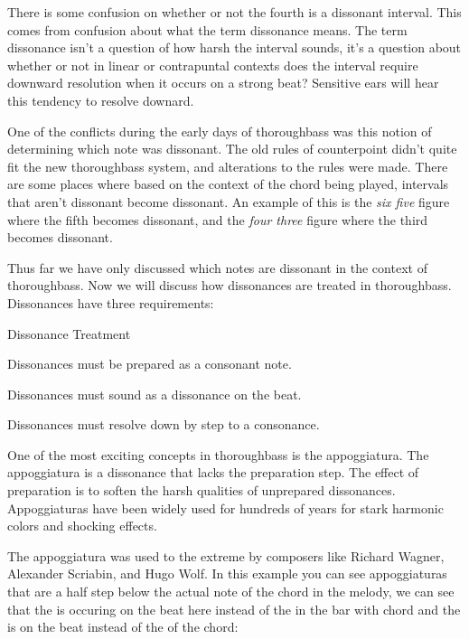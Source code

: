 There is some confusion on whether or not the fourth is a dissonant interval. This comes from confusion about what the term dissonance means. The term dissonance isn't a question of how harsh the interval sounds, it's a question about whether or not in linear or contrapuntal contexts does the interval require downward resolution when it occurs on a strong beat? Sensitive ears will hear this tendency to resolve downard.

One of the conflicts during the early days of thoroughbass was this notion of determining which note was dissonant. The old rules of counterpoint didn't quite fit the new thoroughbass system, and alterations to the rules were made. There are some places where based on the context of the chord being played, intervals that aren't dissonant become dissonant. An  example of this is the \emph{six five} figure where the fifth becomes dissonant, and the \emph{four three} figure where the third becomes dissonant.

Thus far we have only discussed which notes are dissonant in the context of thoroughbass. Now we will discuss how dissonances are treated in thoroughbass. Dissonances have three requirements:


\begin{bookStyledList} {Dissonance Treatment}
\item Dissonances must be prepared as a consonant note.
\item Dissonances must sound as a dissonance on the beat.
\item Dissonances must resolve down by step to a consonance.
\end{bookStyledList}

One of the most exciting concepts in thoroughbass is the appoggiatura. The appoggiatura is a dissonance that lacks the preparation step. The effect of preparation is to soften the harsh qualities of unprepared dissonances. Appoggiaturas have been widely used for hundreds of years for stark harmonic colors and shocking effects.

The appoggiatura was used to the extreme by composers like Richard Wagner, Alexander Scriabin, and Hugo Wolf. In this example you can see appoggiaturas that are a half step below the actual note of the chord in the melody, we can see that the  is occuring on the beat here instead of the  in the bar with  chord and the  is on the beat instead of the of the  chord:

